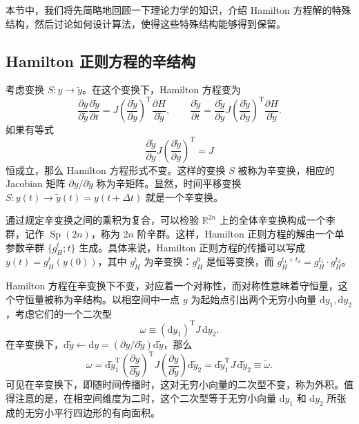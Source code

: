 本节中，我们将先简略地回顾一下理论力学的知识，介绍 Hamilton 方程解的特殊结构，然后讨论如何设计算法，使得这些特殊结构能够得到保留。

\subsection{Hamilton 正则方程的辛结构}

考虑变换 $S:y\to\tilde y$。在这个变换下，Hamilton 方程变为
\begin{equation}
\frac{\partial y}{\partial\tilde y}\frac{\partial\tilde y}{\partial t}
=J\left(\frac{\partial\tilde y}{\partial y}\right)^{\!\mathrm T}\frac{\partial H}{\partial\tilde y},
\qquad
\frac{\partial\tilde y}{\partial t}
=\frac{\partial\tilde y}{\partial y}J\left(\frac{\partial\tilde y}{\partial y}\right)^{\!\mathrm T}\frac{\partial H}{\partial\tilde y}.
\tag{4.4.4}
\end{equation}
如果有等式
\begin{equation}
\frac{\partial\tilde y}{\partial y}J\left(\frac{\partial\tilde y}{\partial y}\right)^{\!\mathrm T}=J
\tag{4.4.5}
\end{equation}
恒成立，那么 Hamilton 方程形式不变。这样的变换 $S$ 被称为辛变换，相应的 Jacobian 矩阵 $\partial y/\partial\tilde y$ 称为辛矩阵。显然，时间平移变换 $S:y(t)\to\tilde y(t)=y(t+\Delta t)$ 就是一个辛变换。

通过规定辛变换之间的乘积为复合，可以检验 $\mathbb R^{2n}$ 上的全体辛变换构成一个李群，记作 $\operatorname{Sp}(2n)$，称为 $2n$ 阶辛群。这样，Hamilton 正则方程的解由一个单参数辛群 $\{g_H^t;t\}$ 生成。具体来说，Hamilton 正则方程的传播可以写成 $y(t)=g_H^t(y(0))$，其中 $g_H^t$ 为辛变换：$g_H^0$ 是恒等变换，而 $g_H^{t_1+t_2}=g_H^{t_1}\cdot g_H^{t_2}$。

Hamilton 方程在辛变换下不变，对应着一个对称性，而对称性意味着守恒量，这个守恒量被称为辛结构。以相空间中一点 $y$ 为起始点引出两个无穷小向量 $\mathrm dy_1,\mathrm dy_2$，考虑它们的一个二次型
\begin{equation}
\omega\equiv(\mathrm dy_1)^{\mathrm T}J\,\mathrm dy_2.
\tag{4.4.6}
\end{equation}
在辛变换下，$\mathrm d\tilde y\leftarrow \mathrm dy=(\partial y/\partial\tilde y)\mathrm d\tilde y$，那么
\begin{equation}
\omega=\mathrm d\tilde y_1^{\mathrm T}
\left(\frac{\partial y}{\partial\tilde y}\right)^{\!\mathrm T}
J\left(\frac{\partial y}{\partial\tilde y}\right)\mathrm d\tilde y_2
=\mathrm d\tilde y_1^{\mathrm T}J\,\mathrm d\tilde y_2\equiv\tilde\omega.
\tag{4.4.7}
\end{equation}
可见在辛变换下，即随时间传播时，这对无穷小向量的二次型不变，称为外积。值得注意的是，在相空间维度为二时，这个二次型等于无穷小向量 $\mathrm dy_1$ 和 $\mathrm dy_2$ 所张成的无穷小平行四边形的有向面积。

